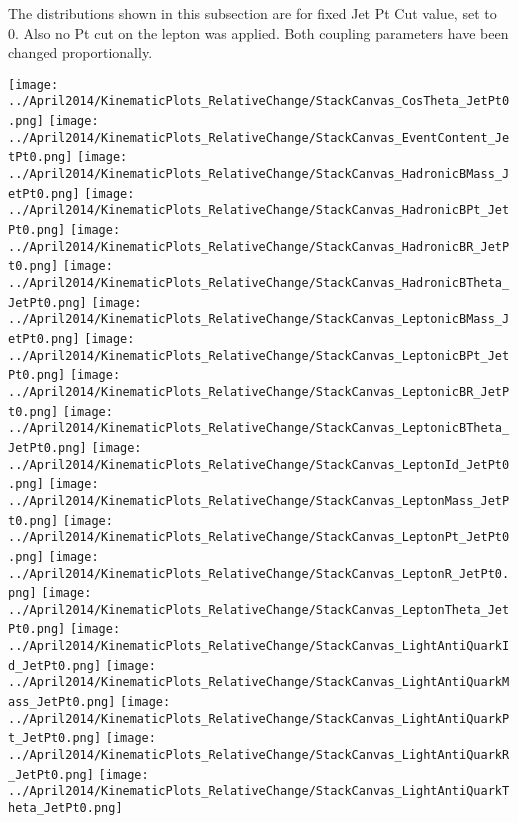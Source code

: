 The distributions shown in this subsection are for fixed Jet Pt Cut value, set to 0. Also no Pt cut on the lepton was applied. Both coupling parameters have been changed proportionally.
\begin{center}
\texttt{[image: ../April2014/KinematicPlots\_RelativeChange/StackCanvas\_CosTheta\_JetPt0.png]}
\texttt{[image: ../April2014/KinematicPlots\_RelativeChange/StackCanvas\_EventContent\_JetPt0.png]}
\texttt{[image: ../April2014/KinematicPlots\_RelativeChange/StackCanvas\_HadronicBMass\_JetPt0.png]}
\texttt{[image: ../April2014/KinematicPlots\_RelativeChange/StackCanvas\_HadronicBPt\_JetPt0.png]}
\texttt{[image: ../April2014/KinematicPlots\_RelativeChange/StackCanvas\_HadronicBR\_JetPt0.png]}
\texttt{[image: ../April2014/KinematicPlots\_RelativeChange/StackCanvas\_HadronicBTheta\_JetPt0.png]}
\texttt{[image: ../April2014/KinematicPlots\_RelativeChange/StackCanvas\_LeptonicBMass\_JetPt0.png]}
\texttt{[image: ../April2014/KinematicPlots\_RelativeChange/StackCanvas\_LeptonicBPt\_JetPt0.png]}
\texttt{[image: ../April2014/KinematicPlots\_RelativeChange/StackCanvas\_LeptonicBR\_JetPt0.png]}
\texttt{[image: ../April2014/KinematicPlots\_RelativeChange/StackCanvas\_LeptonicBTheta\_JetPt0.png]}
\texttt{[image: ../April2014/KinematicPlots\_RelativeChange/StackCanvas\_LeptonId\_JetPt0.png]}
\texttt{[image: ../April2014/KinematicPlots\_RelativeChange/StackCanvas\_LeptonMass\_JetPt0.png]}
\texttt{[image: ../April2014/KinematicPlots\_RelativeChange/StackCanvas\_LeptonPt\_JetPt0.png]}
\texttt{[image: ../April2014/KinematicPlots\_RelativeChange/StackCanvas\_LeptonR\_JetPt0.png]}
\texttt{[image: ../April2014/KinematicPlots\_RelativeChange/StackCanvas\_LeptonTheta\_JetPt0.png]}
\texttt{[image: ../April2014/KinematicPlots\_RelativeChange/StackCanvas\_LightAntiQuarkId\_JetPt0.png]}
\texttt{[image: ../April2014/KinematicPlots\_RelativeChange/StackCanvas\_LightAntiQuarkMass\_JetPt0.png]}
\texttt{[image: ../April2014/KinematicPlots\_RelativeChange/StackCanvas\_LightAntiQuarkPt\_JetPt0.png]}
\texttt{[image: ../April2014/KinematicPlots\_RelativeChange/StackCanvas\_LightAntiQuarkR\_JetPt0.png]}
\texttt{[image: ../April2014/KinematicPlots\_RelativeChange/StackCanvas\_LightAntiQuarkTheta\_JetPt0.png]}

\end{center}
